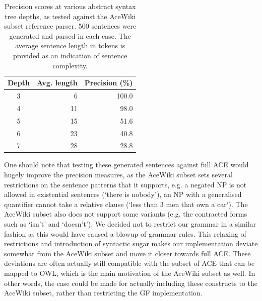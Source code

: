 \documentclass[a4paper]{article}
\begin{document}
\begin{table}
\begin{center}
\begin{tabular}{ c r r }
\hline
Depth & Avg. length & Precision (\%) \\
\hline
3 & 6 & 100.0 \\
4 & 11 & 98.0 \\
5 & 15 & 51.6 \\
6 & 23 & 40.8 \\
7 & 28 & 28.8 \\
\hline
\end{tabular}
\end{center}
\caption{Precision scores at various abstract syntax tree depths, as
  tested against the AceWiki subset reference parser. 500 sentences
  were generated and parsed in each case. The average sentence length
  in tokens is provided as an indication of
  sentence complexity.\protect\label{table:precision_scores}}
\end{table}

One should note that testing these generated sentences against full
ACE would hugely improve the precision measures, as the AceWiki subset
sets several restrictions on the sentence patterns that it supports,
e.g. a negated NP is not allowed in existential sentences (`there is
nobody'), an NP with a generalised quantifier cannot take a relative
clause (`less than 3 men that own a car`). The AceWiki subset also
does not support some variants (e.g. the contracted forms such as
`isn't' and `doesn't').  We decided not to restrict our grammar in a
similar fashion as this would have caused a blowup of grammar
rules. This relaxing of restrictions and introduction of syntactic
sugar makes our implementation deviate somewhat from the AceWiki subset
and move it closer towards full ACE.
These deviations are often actually still compatible with the
subset of ACE that can be mapped to OWL, which is the main motivation
of the AceWiki subset as well. In other words, the case could be
made for actually including these constructs to the AceWiki subset, rather
than restricting the GF implementation.

\end{document}
